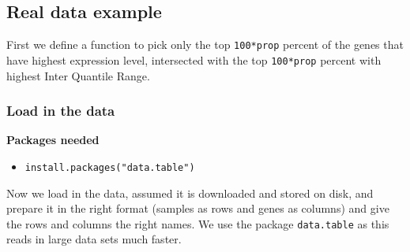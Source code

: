 \documentclass[]{article}
\newenvironment{Shaded}{\begin{snugshade}}{\end{snugshade}}
\newcommand{\KeywordTok}[1]{\textcolor[rgb]{0.13,0.29,0.53}{\textbf{{#1}}}}
\newcommand{\DataTypeTok}[1]{\textcolor[rgb]{0.13,0.29,0.53}{{#1}}}
\newcommand{\DecValTok}[1]{\textcolor[rgb]{0.00,0.00,0.81}{{#1}}}
\newcommand{\FloatTok}[1]{\textcolor[rgb]{0.00,0.00,0.81}{{#1}}}
\newcommand{\StringTok}[1]{\textcolor[rgb]{0.31,0.60,0.02}{{#1}}}
\newcommand{\CommentTok}[1]{\textcolor[rgb]{0.56,0.35,0.01}{\textit{{#1}}}}
\newcommand{\OtherTok}[1]{\textcolor[rgb]{0.56,0.35,0.01}{{#1}}}
\newcommand{\NormalTok}[1]{{#1}}
\providecommand{\tightlist}{%
  \setlength{\itemsep}{0pt}\setlength{\parskip}{0pt}}
\begin{document}
\subsection{Real data example}\label{real-data-example}

First we define a function to pick only the top \texttt{100*prop}
percent of the genes that have highest expression level, intersected
with the top \texttt{100*prop} percent with highest Inter Quantile
Range.

\begin{Shaded}
\end{Shaded}

\subsubsection{Load in the data}\label{load-in-the-data}

\textbf{Packages needed}

\begin{itemize}
\tightlist
\item
  \texttt{install.packages("data.table")}
\end{itemize}

Now we load in the data, assumed it is downloaded and stored on disk,
and prepare it in the right format (samples as rows and genes as
columns) and give the rows and columns the right names. We use the
package \texttt{data.table} as this reads in large data sets much
faster.
\end{document}
